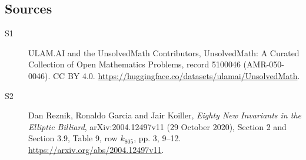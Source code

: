 \documentclass[11pt]{article}
\begin{document}
\subsection{Sources}
\begin{description}
\item[\hypertarget{source:5100046:1}{S1}] ULAM.AI and the UnsolvedMath Contributors, UnsolvedMath: A Curated Collection of Open Mathematics Problems, record 5100046 (AMR-050-0046). CC BY 4.0. \url{https://huggingface.co/datasets/ulamai/UnsolvedMath}.
\item[\hypertarget{source:5100046:2}{S2}] Dan Reznik, Ronaldo Garcia and Jair Koiller, \emph{Eighty New Invariants in the Elliptic Billiard}, arXiv:2004.12497v11 (29 October 2020), Section 2 and Section 3.9, Table 9, row $k_{805}$, pp. 3, 9--12. \url{https://arxiv.org/abs/2004.12497v11}.
\end{description}
\label{end:5100046}
\end{document}
